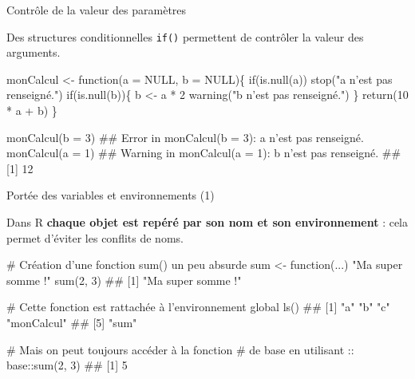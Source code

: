 \documentclass[12pt,ignorenonframetext,]{beamer}
\newenvironment{Shaded}{}{}
\newcommand{\KeywordTok}[1]{\textcolor[rgb]{0.00,0.00,1.00}{#1}}
\newcommand{\DataTypeTok}[1]{#1}
\newcommand{\DecValTok}[1]{#1}
\newcommand{\StringTok}[1]{\textcolor[rgb]{0.00,0.50,0.50}{#1}}
\newcommand{\CommentTok}[1]{\textcolor[rgb]{0.00,0.50,0.00}{#1}}
\newcommand{\OtherTok}[1]{\textcolor[rgb]{1.00,0.25,0.00}{#1}}
\newcommand{\ControlFlowTok}[1]{\textcolor[rgb]{0.00,0.00,1.00}{#1}}
\newcommand{\OperatorTok}[1]{#1}
\newcommand{\NormalTok}[1]{#1}
\renewenvironment{Shaded}{\begin{snugshade}}{\end{snugshade}}
\begin{document}
\begin{frame}[fragile]{Contrôle de la valeur des paramètres}

Des structures conditionnelles \texttt{if()} permettent de contrôler la
valeur des arguments.

\pause \footnotesize

\begin{Shaded}
\begin{Highlighting}[]
\NormalTok{monCalcul <-}\StringTok{ }\ControlFlowTok{function}\NormalTok{(}\DataTypeTok{a =} \OtherTok{NULL}\NormalTok{, }\DataTypeTok{b =} \OtherTok{NULL}\NormalTok{)\{}
  \ControlFlowTok{if}\NormalTok{(}\KeywordTok{is.null}\NormalTok{(a)) }\KeywordTok{stop}\NormalTok{(}\StringTok{"a n'est pas renseigné."}\NormalTok{)}
  \ControlFlowTok{if}\NormalTok{(}\KeywordTok{is.null}\NormalTok{(b))\{}
\NormalTok{    b <-}\StringTok{ }\NormalTok{a }\OperatorTok{*}\StringTok{ }\DecValTok{2}
    \KeywordTok{warning}\NormalTok{(}\StringTok{"b n'est pas renseigné."}\NormalTok{)}
\NormalTok{  \}}
  \KeywordTok{return}\NormalTok{(}\DecValTok{10} \OperatorTok{*}\StringTok{ }\NormalTok{a }\OperatorTok{+}\StringTok{ }\NormalTok{b)}
\NormalTok{\}}

\KeywordTok{monCalcul}\NormalTok{(}\DataTypeTok{b =} \DecValTok{3}\NormalTok{)}
\NormalTok{  ## Error in monCalcul(b = 3): a n'est pas renseigné.}
\KeywordTok{monCalcul}\NormalTok{(}\DataTypeTok{a =} \DecValTok{1}\NormalTok{)}
\NormalTok{  ## Warning in monCalcul(a = 1): b n'est pas renseigné.}
\NormalTok{  ## [1] 12}
\end{Highlighting}
\end{Shaded}

\end{frame}

\begin{frame}[fragile]{\large Portée des variables et environnements
(1)}

Dans R \textbf{chaque objet est repéré par son nom et son environnement}
: cela permet d'éviter les conflits de noms.

\pause \footnotesize

\begin{Shaded}
\begin{Highlighting}[]
\CommentTok{# Création d'une fonction sum() un peu absurde}
\NormalTok{sum <-}\StringTok{ }\ControlFlowTok{function}\NormalTok{(...) }\StringTok{"Ma super somme !"}
\KeywordTok{sum}\NormalTok{(}\DecValTok{2}\NormalTok{, }\DecValTok{3}\NormalTok{)}
\NormalTok{  ## [1] "Ma super somme !"}

\CommentTok{# Cette fonction est rattachée à l'environnement global}
\KeywordTok{ls}\NormalTok{()}
\NormalTok{  ## [1] "a"         "b"         "c"         "monCalcul"}
\NormalTok{  ## [5] "sum"}

\CommentTok{# Mais on peut toujours accéder à la fonction }
\CommentTok{# de base en utilisant ::}
\NormalTok{base}\OperatorTok{::}\KeywordTok{sum}\NormalTok{(}\DecValTok{2}\NormalTok{, }\DecValTok{3}\NormalTok{)}
\NormalTok{  ## [1] 5}
\end{Highlighting}
\end{Shaded}

\end{frame}
\end{document}
